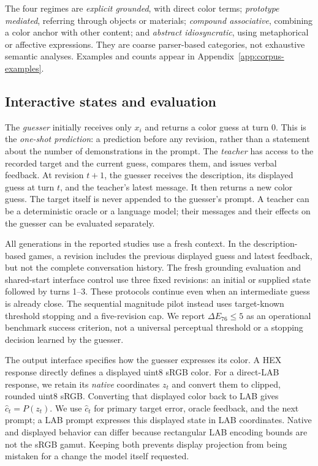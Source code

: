 \documentclass[11pt]{article}
\begin{document}
The four regimes are \emph{explicit grounded}, with direct color terms;
\emph{prototype mediated}, referring through objects or materials;
\emph{compound associative}, combining a color anchor with other content;
and \emph{abstract idiosyncratic}, using metaphorical or affective expressions.
They are coarse parser-based categories, not exhaustive semantic analyses.
Examples and counts appear in Appendix~\ref{app:corpus-examples}.

\subsection{Interactive states and evaluation}
\label{sec:game}
The \emph{guesser} initially receives only $x_i$ and returns a color guess
at turn 0. This is the \emph{one-shot prediction}: a prediction before any
revision, rather than a statement about the number of demonstrations in
the prompt. The \emph{teacher} has access to the recorded target and the
current guess, compares them, and issues verbal feedback. At revision
$t+1$, the guesser receives the description, its displayed guess at turn
$t$, and the teacher's latest message. It then returns a new color guess.
The target itself is never appended to the guesser's prompt. A teacher
can be a deterministic oracle or a language model; their messages and
their effects on the guesser can be evaluated separately.

All generations in the reported studies use a fresh context. In the
description-based games, a revision includes the previous displayed guess
and latest feedback, but not the complete conversation history. The fresh
grounding evaluation and shared-start interface control use three fixed
revisions: an initial or supplied state followed by turns 1--3. These
protocols continue even when an intermediate guess is already close.
The sequential magnitude pilot instead uses target-known threshold
stopping and a five-revision cap. We report $\Delta E_{76}\leq5$ as an
operational benchmark success criterion, not a universal perceptual
threshold or a stopping decision learned by the guesser.

The output interface specifies how the guesser expresses its color.
A HEX response directly defines a displayed uint8 sRGB color. For a
direct-LAB response, we retain its \emph{native} coordinates $z_t$ and
convert them to clipped, rounded uint8 sRGB. Converting that displayed
color back to LAB gives $\hat c_t=P(z_t)$. We use $\hat c_t$ for primary
target error, oracle feedback, and the next prompt; a LAB prompt expresses
this displayed state in LAB coordinates. Native and displayed behavior
can differ because rectangular LAB encoding bounds are not the sRGB
gamut. Keeping both prevents display projection from being mistaken for
a change the model itself requested.
\end{document}
